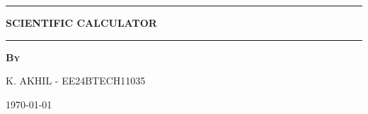 \begin{titlepage}
\begin{center}
\vfill
\vspace{6cm}
\hrule
\vspace{.5cm}
{\huge \bfseries SCIENTIFIC CALCULATOR} %
\vspace{.5cm}

\hrule
\vspace{1.5cm}

\textsc{\textbf{By}}\\
\vspace{.5cm}

K. AKHIL - EE24BTECH11035\\

\vspace{2cm}

\today %

\vfill
\end{center}
\end{titlepage}
